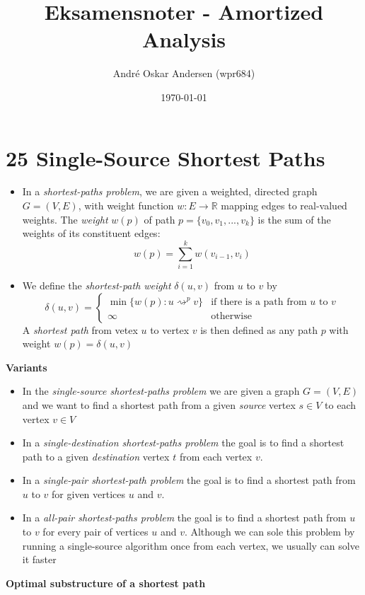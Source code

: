 \documentclass{report}
\title{Eksamensnoter - Amortized Analysis}
\author{André Oskar Andersen (wpr684)}
\date{\today}
\begin{document}
\maketitle

\section*{25 Single-Source Shortest Paths}
\begin{itemize}
    \item In a \textit{shortest-paths problem}, we are given a weighted, directed graph $G = (V, E)$, with weight function $w: E \rightarrow \mathbb{R}$ mapping edges to real-valued weights. The \textit{weight} $w(p)$ of path $p = \{v_0, v_1, ..., v_k\}$ is the sum of the weights of its constituent edges:
    $$w(p) = \sum^k _{i = 1} w(v_{i - 1}, v_i)$$
    \item We define the \textit{shortest-path weight} $\delta(u, v)$ from $u$ to $v$ by
    \[
      \delta(u, v) =
      \begin{cases}
          \min\{w(p): u \rightsquigarrow^p v\} & \text{if there is a path from $u$ to $v$} \\
          \infty & \text{otherwise}
      \end{cases}
    \]
    A \textit{shortest path} from vetex $u$ to vertex $v$ is then defined as any path $p$ with weight $w(p) = \delta(u, v)$
\end{itemize}
\textbf{Variants}
\begin{itemize}
    \item In the \textit{single-source shortest-paths problem} we are given a graph $G = (V, E)$ and we want to find a shortest path from a given \textit{source} vertex $s \in V$ to each vertex $v \in V$
    \item In a \textit{single-destination shortest-paths problem} the goal is to find a shortest path to a given \textit{destination} vertex $t$ from each vertex $v$. 
    \item In a \textit{single-pair shortest-path problem} the goal is to find a shortest path from $u$ to $v$ for given vertices $u$ and $v$.
    \item In a \textit{all-pair shortest-paths problem} the goal is to find a shortest path from $u$ to $v$ for every pair of vertices $u$ and $v$. Although we can sole this problem by running a single-source algorithm once from each vertex, we usually can solve it faster
\end{itemize}
\textbf{Optimal substructure of a shortest path}
\end{document}
